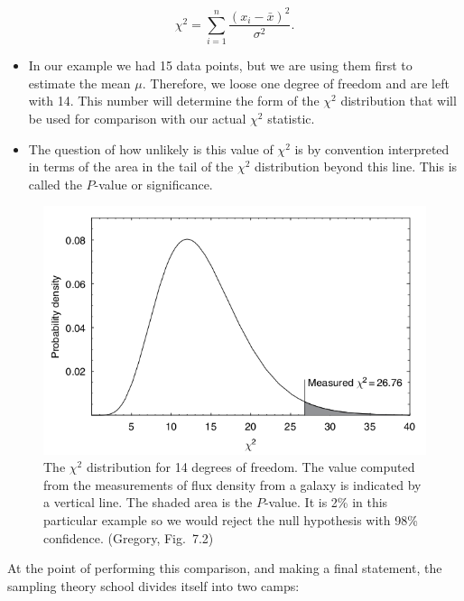 \documentclass[%
oneside,                 %
final,                   %
10pt]{article}
\begin{document}
\noindent
\[
\chi^2 = \sum_{i=1}^n \frac{(x_i - \bar{x})^2}{\sigma^2}.
\]

\begin{itemize}
\item In our example we had 15 data points, but we are using them first to estimate the mean $\mu$. Therefore, we loose one degree of freedom and are left with 14. This number will determine the form of the $\chi^2$ distribution that will be used for comparison with our actual $\chi^2$ statistic.

\item The question of how unlikely is this value of $\chi^2$ is by convention interpreted in terms of the area in the tail of the $\chi^2$ distribution beyond this line. This is called the $P$-value or significance.
\end{itemize}

\noindent

\begin{figure}[!ht]  %
  \centerline{\includegraphics[width=0.8\linewidth]{fig/gregory_7_2.png}}
  \caption{
  The $\chi^2$ distribution for 14 degrees of freedom. The value computed from the measurements of flux density from a galaxy is indicated by a vertical line. The shaded area is the $P$-value. It is 2\% in this particular example so we would reject the null hypothesis with 98\% confidence. (Gregory, Fig.~7.2)
  }
\end{figure}



At the point of performing this comparison, and making a final statement, the sampling theory school divides itself into two camps:
\end{document}
